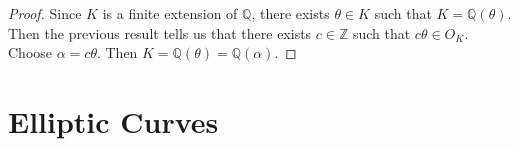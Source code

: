 \documentclass[12pt]{amsart}
\theoremstyle{definition}
\theoremstyle{remark}
\theoremstyle{definition}
\newcommand{\al}{\alpha}
\newcommand{\Z}{\mathbb{Z}}
\newcommand{\Q}{\mathbb{Q}}
\begin{document}
\begin{proof}
Since $K$ is a finite extension of $\Q$, there exists $\theta \in K$ such that $K = \Q(\theta)$. Then the previous result tells us that there exists $c \in \Z$ such that $c\theta \in O_K$. Choose $\al = c\theta$. Then $K = \Q(\theta) = \Q(\al)$.
\end{proof}






























\newpage
	\section{Elliptic Curves}
\end{document}
